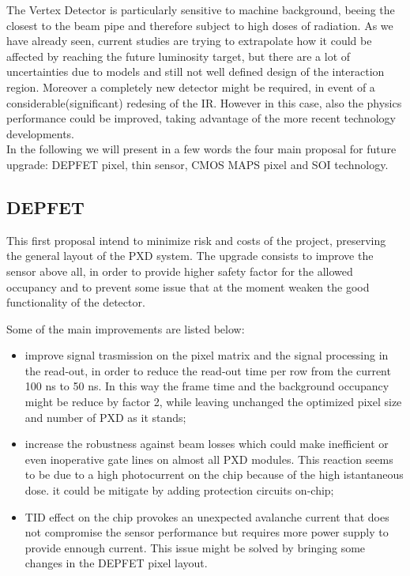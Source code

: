 The Vertex Detector is particularly sensitive to machine background, beeing the closest to the beam pipe and therefore subject to high doses of radiation.
As we have already seen, current studies are trying to extrapolate how it could be affected by reaching the future luminosity target, but there are a lot of uncertainties due to models and still not well defined design of the interaction region. Moreover a completely new detector might be required, in event of a considerable(significant) redesing of the IR. However in this case, also the physics performance could be improved, taking advantage of the more recent technology developments.\\

In the following we will present in a few words the four main proposal for future upgrade: DEPFET pixel, thin sensor, CMOS MAPS pixel and SOI technology.



\subsection{DEPFET}

This first proposal intend to minimize risk and costs of the project, preserving the general layout of the PXD system. The upgrade consists to improve the sensor above all, in order to provide higher safety factor for the allowed occupancy and to prevent some issue that at the moment weaken the good functionality of the detector.

Some of the main improvements are listed below:

\begin{itemize}
\item improve signal trasmission on the pixel matrix and the signal processing in the read-out, in order to reduce the read-out time per row from the current 100 ns to 50 ns. In this way the frame time and the background occupancy might be reduce by factor 2, while leaving unchanged the optimized pixel size and number of PXD as it stands;
\item increase the robustness against beam losses which could make inefficient or even inoperative gate lines on almost all PXD modules. This reaction seems to be due to a high photocurrent on the chip because of the high istantaneous dose. it could be mitigate by adding protection circuits on-chip;
\item TID effect on the chip provokes an unexpected avalanche current that does not compromise the sensor performance but requires more power supply to provide ennough current. This issue might be solved by bringing some changes in the DEPFET pixel layout.
\end{itemize}

